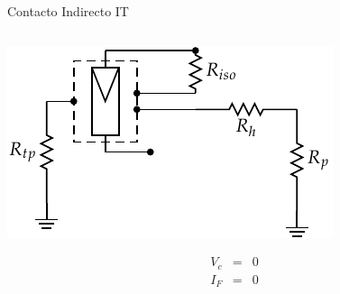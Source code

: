 \documentclass[xcolor={usenames,svgnames,dvipsnames}]{beamer}
\begin{document}
\begin{frame}[label={sec:org0a4e888}]{Contacto Indirecto IT}
\begin{columns}
\begin{column}{0.5\columnwidth}
\begin{center}
\includegraphics[width=\textwidth]{../figs/ContactoIndirectoIT.pdf}
\end{center}

$$\begin{aligned}
V_{c} & = & 0\\
I_{F} & = & 0\end{aligned}$$
\end{column}


\end{columns}
\end{frame}
\end{document}
